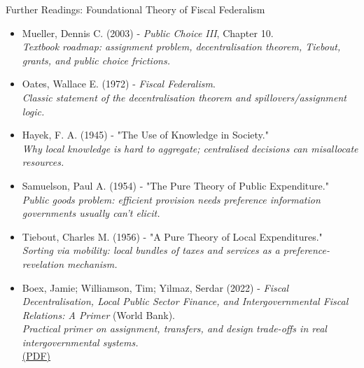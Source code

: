 \documentclass[10pt]{beamer}
\begin{document}
\begin{frame}[allowframebreaks]{Further Readings: Foundational Theory of Fiscal Federalism}
\footnotesize
\begin{itemize}
\item Mueller, Dennis C. (2003) - \textit{Public Choice III}, Chapter 10.\\
\textit{Textbook roadmap: assignment problem, decentralisation theorem, Tiebout, grants, and public choice frictions.}

\item Oates, Wallace E. (1972) - \textit{Fiscal Federalism}.\\
\textit{Classic statement of the decentralisation theorem and spillovers/assignment logic.}

\item Hayek, F. A. (1945) - "The Use of Knowledge in Society."\\
\textit{Why local knowledge is hard to aggregate; centralised decisions can misallocate resources.}

\item Samuelson, Paul A. (1954) - "The Pure Theory of Public Expenditure."\\
\textit{Public goods problem: efficient provision needs preference information governments usually can't elicit.}

\item Tiebout, Charles M. (1956) - "A Pure Theory of Local Expenditures."\\
\textit{Sorting via mobility: local bundles of taxes and services as a preference-revelation mechanism.}

\item Boex, Jamie; Williamson, Tim; Yilmaz, Serdar (2022) - \textit{Fiscal Decentralisation, Local Public Sector Finance, and Intergovernmental Fiscal Relations: A Primer} (World Bank).\\
\textit{Practical primer on assignment, transfers, and design trade-offs in real intergovernmental systems.}\\
\href{https://documents1.worldbank.org/curated/en/099225502022316135/pdf/P1754490fe142c0db095050e3808607c8ff.pdf}{(PDF)}
\end{itemize}
\end{frame}
\end{document}
